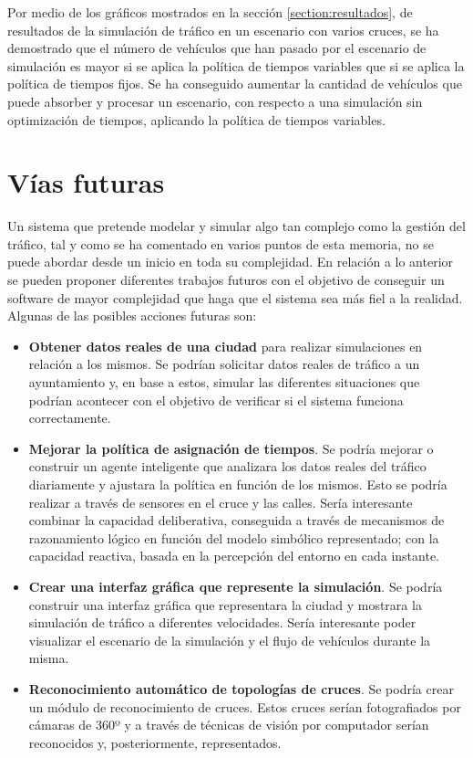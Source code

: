Por medio de los gráficos mostrados en la sección \ref{section:resultados}, de resultados de la simulación de tráfico en un escenario con varios cruces, se ha demostrado que el número de vehículos que han pasado por el escenario de simulación es mayor si se aplica la política de tiempos variables que si se aplica la política de tiempos fijos. Se ha conseguido aumentar la cantidad de vehículos que puede absorber y procesar un escenario, con respecto a una simulación sin optimización de tiempos, aplicando la política de tiempos variables.


\chapter{Vías futuras}
    \label{chap:nine}
Un sistema que pretende modelar y simular algo tan complejo como la gestión del tráfico, tal y como se ha comentado en varios puntos de esta memoria, no se puede abordar desde un inicio en toda su complejidad. En relación a lo anterior se pueden proponer diferentes trabajos futuros con el objetivo de conseguir un software de mayor complejidad que haga que el sistema sea más fiel a la realidad. Algunas de las posibles acciones futuras son:
\begin{itemize}
    \item\textbf{Obtener datos reales de una ciudad} para realizar simulaciones en relación a los mismos. Se podrían solicitar datos reales de tráfico a un ayuntamiento y, en base a estos, simular las diferentes situaciones que podrían acontecer con el objetivo de verificar si el sistema funciona correctamente.
    \item \textbf{Mejorar la política de asignación de tiempos}. Se podría mejorar o construir un agente inteligente que analizara los datos reales del tráfico diariamente y ajustara la política en función de los mismos. Esto se podría realizar a través de sensores en el cruce y las calles. Sería interesante combinar la capacidad deliberativa, conseguida a través de mecanismos de razonamiento lógico en función del modelo simbólico representado; con la capacidad reactiva, basada en la percepción del entorno en cada instante.
    \item \textbf{Crear una interfaz gráfica que represente la simulación}. Se podría construir una interfaz gráfica que representara la ciudad y mostrara la simulación de tráfico a diferentes velocidades. Sería interesante poder visualizar el escenario de la simulación y el flujo de vehículos durante la misma.
    \item \textbf{Reconocimiento automático de topologías de cruces}. Se podría crear un módulo de reconocimiento de cruces. Estos cruces serían fotografiados por cámaras de 360º y a través de técnicas de visión por computador serían reconocidos y, posteriormente, representados.
\end{itemize}

